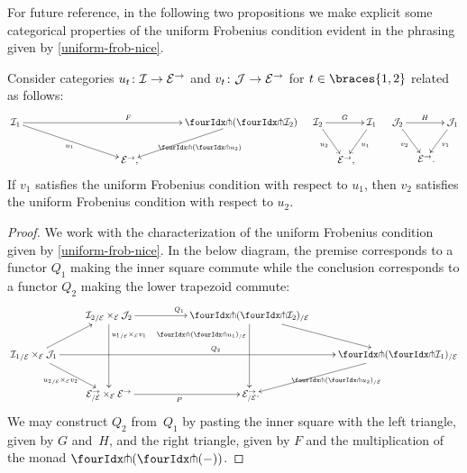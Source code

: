 \documentclass[reqno,10pt,a4paper,oneside,draft]{amsart}
\begin{document}
For future reference,  in the following two propositions we make explicit some categorical properties of the uniform Frobenius condition evident in the phrasing given by \cref{uniform-frob-nice}.

\begin{proposition} \label{uniform-frobenius-functorial}
Consider categories $u_t \colon \mathcal{I} \to \mathcal{E}^\to$ and $v_t \colon \mathcal{J} \to \mathcal{E}^\to$ for $t \in \braces{1, 2}$ related as follows:
\begin{align*}
\xymatrix@!C@C-3em{
  \cal{I}_1
  \ar[rr]^{F}
  \ar[dr]_{u_1}
&&
  \liftl{(\liftr{\cal{I}_2})}
  \ar[dl]^{\liftl{(\liftr{u_2})}}
\\&
  \catE^\to
\rlap{,}}
&&
\xymatrix@C-1.5em{
  \cal{I}_2
  \ar[rr]^-{G}
  \ar[dr]_{u_2}
&&
  \cal{I}_1
  \ar[dl]^{u_1}
\\&
  \catE^\to
\rlap{,}}
&&
\xymatrix@C-1.5em{
  \cal{J}_2
  \ar[rr]^-{H}
  \ar[dr]_{v_2}
&&
  \cal{J}_1
  \ar[dl]^{v_1}
\\&
  \catE^\to
\rlap{.}}
\end{align*}
If $v_1$ satisfies the uniform Frobenius condition with respect to $u_1$, then
$v_2$ satisfies the uniform Frobenius condition with respect to $u_2$.
\end{proposition}


\begin{proof}
We work with the characterization of the uniform Frobenius condition given by \cref{uniform-frob-nice}.
In the below diagram, the premise corresponds to a functor $Q_1$ making the inner square commute while the conclusion corresponds to a functor $Q_2$ making the lower trapezoid commute:
\[
\xymatrix{
&
  {\cal{I}_2}_{/\cal{E}} \times_{\cal{E}} \cal{J}_2
  \ar[rr]^{Q_1}
  \ar[dd]^(0.25){{u_1}_{/\cal{E}} \times_{\cal{E}} v_1}
&&
  \liftl{(\liftr{\cal{I}_2})}_{/\cal{E}}
  \ar[dr]
  \ar[dd]_(0.25){\liftl{(\liftr{u_1})}_{/\cal{E}}}
\\
  {\cal{I}_1}_{/\cal{E}} \times_{\cal{E}} \cal{J}_1
  \ar[ur]
  \ar[dr]_{{u_2}_{/\cal{E}} \times_{\cal{E}} v_2}
  \ar[rrrr]^{Q_2}
&&&&
  \liftl{(\liftr{\cal{I}_1})}_{/\cal{E}}
  \ar[dl]^{\liftl{(\liftr{u_2})}_{/\cal{E}}}
\\&
  \cal{E}^\to_{/\cal{E}} \times_{\cal{E}} \cal{E}^\to
  \ar[rr]_{P}
&&
  \cal{E}^\to_{/\cal{E}}
\rlap{.}}
\]
We may construct $Q_2$ from~$Q_1$ by pasting the inner square with the left triangle, given by $G$ and~$H$, and the right triangle, given by $F$ and the multiplication of the monad $\liftl{(\liftr{(-)})}$.
\end{proof}
\end{document}
